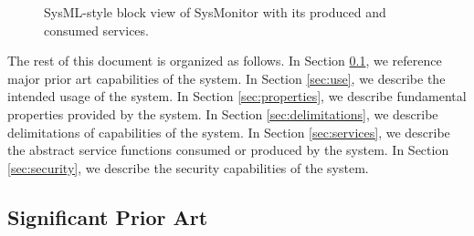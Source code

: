 \documentclass[a4paper]{arrowhead}
\begin{document}
\begin{figure}[ht!]
  \centering
  \caption{SysML-style block view of SysMonitor with its produced and consumed services.}
  \label{fig:system}
\end{figure}

The rest of this document is organized as follows.
In Section \ref{sec:prior_art}, we reference major prior art capabilities of the system.
In Section \ref{sec:use}, we describe the intended usage of the system.
In Section \ref{sec:properties}, we describe fundamental properties provided by the system.
In Section \ref{sec:delimitations}, we describe delimitations of capabilities of the system.
In Section \ref{sec:services}, we describe the abstract service functions consumed or produced by the system.
In Section \ref{sec:security}, we describe the security capabilities of the system.

\newpage

\subsection{Significant Prior Art}
\label{sec:prior_art}
\end{document}
